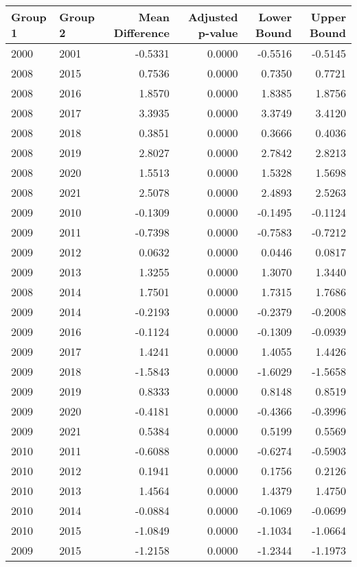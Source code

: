 \begin{tabular}{llrrrr}
\toprule
Group 1 & Group 2 & Mean Difference & Adjusted p-value & Lower Bound & Upper Bound \\
\midrule
2000 & 2001 & -0.5331 & 0.0000 & -0.5516 & -0.5145 \\
2008 & 2015 & 0.7536 & 0.0000 & 0.7350 & 0.7721 \\
2008 & 2016 & 1.8570 & 0.0000 & 1.8385 & 1.8756 \\
2008 & 2017 & 3.3935 & 0.0000 & 3.3749 & 3.4120 \\
2008 & 2018 & 0.3851 & 0.0000 & 0.3666 & 0.4036 \\
2008 & 2019 & 2.8027 & 0.0000 & 2.7842 & 2.8213 \\
2008 & 2020 & 1.5513 & 0.0000 & 1.5328 & 1.5698 \\
2008 & 2021 & 2.5078 & 0.0000 & 2.4893 & 2.5263 \\
2009 & 2010 & -0.1309 & 0.0000 & -0.1495 & -0.1124 \\
2009 & 2011 & -0.7398 & 0.0000 & -0.7583 & -0.7212 \\
2009 & 2012 & 0.0632 & 0.0000 & 0.0446 & 0.0817 \\
2009 & 2013 & 1.3255 & 0.0000 & 1.3070 & 1.3440 \\
2008 & 2014 & 1.7501 & 0.0000 & 1.7315 & 1.7686 \\
2009 & 2014 & -0.2193 & 0.0000 & -0.2379 & -0.2008 \\
2009 & 2016 & -0.1124 & 0.0000 & -0.1309 & -0.0939 \\
2009 & 2017 & 1.4241 & 0.0000 & 1.4055 & 1.4426 \\
2009 & 2018 & -1.5843 & 0.0000 & -1.6029 & -1.5658 \\
2009 & 2019 & 0.8333 & 0.0000 & 0.8148 & 0.8519 \\
2009 & 2020 & -0.4181 & 0.0000 & -0.4366 & -0.3996 \\
2009 & 2021 & 0.5384 & 0.0000 & 0.5199 & 0.5569 \\
2010 & 2011 & -0.6088 & 0.0000 & -0.6274 & -0.5903 \\
2010 & 2012 & 0.1941 & 0.0000 & 0.1756 & 0.2126 \\
2010 & 2013 & 1.4564 & 0.0000 & 1.4379 & 1.4750 \\
2010 & 2014 & -0.0884 & 0.0000 & -0.1069 & -0.0699 \\
2010 & 2015 & -1.0849 & 0.0000 & -1.1034 & -1.0664 \\
2009 & 2015 & -1.2158 & 0.0000 & -1.2344 & -1.1973 \\

\end{tabular}
